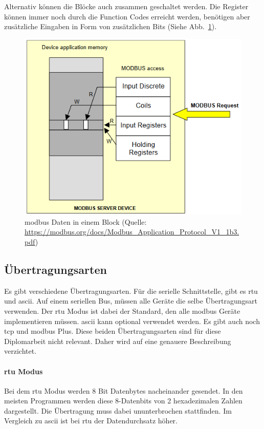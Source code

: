 Alternativ können die Blöcke auch zusammen geschaltet werden. Die Register können immer noch durch die Function Codes erreicht werden, benötigen aber zusätzliche Eingaben in Form von zusätzlichen Bits (Siehe Abb.~\ref{fig:modbus_register_one_block}).
\begin{figure}[H]
	\centering
	\includegraphics[width=0.6\linewidth]{Bilder/Modbus_Data_Model_with_one_block}
	\caption{\gls{modbus} Daten in einem Block (Quelle: \url{https://modbus.org/docs/Modbus_Application_Protocol_V1_1b3.pdf})}
	\label{fig:modbus_register_one_block}
\end{figure}

\subsection{Übertragungsarten} \label{modbus_uebertragungsarten}
Es gibt verschiedene Übertragungsarten. Für die serielle Schnittstelle, gibt es \acf{rtu} und \acf{ascii}. Auf einem seriellen Bus, müssen alle Geräte die selbe Übertragungsart verwenden. Der \acs{rtu} Modus ist dabei der Standard, den alle \gls{modbus} Geräte implementieren müssen. \acs{ascii} kann optional verwendet werden. \newline Es gibt auch noch \acs{tcp} und \gls{modbus} Plus. Diese beiden Übertragungsarten sind für diese Diplomarbeit nicht relevant. Daher wird auf eine genauere Beschreibung verzichtet.

\paragraph{\acs{rtu} Modus}
Bei dem \acs{rtu} Modus werden 8 Bit Datenbytes nacheinander gesendet. In den meisten Programmen werden diese 8-Datenbits von 2 hexadezimalen Zahlen dargestellt. Die Übertragung muss dabei ununterbrochen stattfinden. Im Vergleich zu \acs{ascii} ist bei \acs{rtu} der Datendurchsatz höher. 

